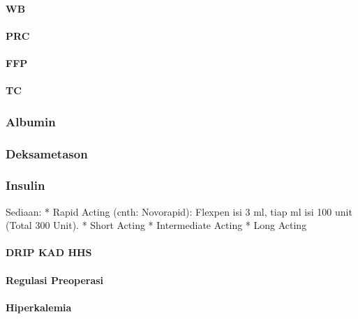 \documentclass[
]{book}
\begin{document}
\hypertarget{wb}{%
\paragraph{WB}\label{wb}}

\hypertarget{prc}{%
\paragraph{PRC}\label{prc}}

\hypertarget{ffp}{%
\paragraph{FFP}\label{ffp}}

\hypertarget{tc}{%
\paragraph{TC}\label{tc}}

\hypertarget{albumin}{%
\subsubsection{Albumin}\label{albumin}}

\hypertarget{deksametason}{%
\subsubsection{Deksametason}\label{deksametason}}

\hypertarget{insulin}{%
\subsubsection{Insulin}\label{insulin}}

Sediaan:
* Rapid Acting (cnth: Novorapid): Flexpen isi 3 ml, tiap ml isi 100 unit (Total 300 Unit).
* Short Acting
* Intermediate Acting
* Long Acting

\hypertarget{drip-kad-hhs}{%
\paragraph{DRIP KAD HHS}\label{drip-kad-hhs}}

\hypertarget{regulasi-preoperasi}{%
\paragraph{Regulasi Preoperasi}\label{regulasi-preoperasi}}

\hypertarget{hiperkalemia}{%
\paragraph{Hiperkalemia}\label{hiperkalemia}}
\end{document}
